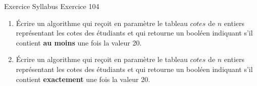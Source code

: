 \begin{frame}{Exercice \theexercice}{Syllabus Exercice 104}
    \begin{enumerate}
        \item Écrire un algorithme qui reçoit en paramètre le tableau
        $cotes$ de $n$ entiers représentant les cotes des étudiants
        et qui retourne un booléen indiquant s’il contient \textbf{au
        moins} une fois la valeur 20.

        \item\pause Écrire un algorithme qui reçoit en paramètre le tableau
        $cotes$ de $n$ entiers représentant les cotes des étudiants
        et qui retourne un booléen indiquant s’il contient
        \textbf{exactement} une fois la valeur 20.

    \end{enumerate}
\end{frame}